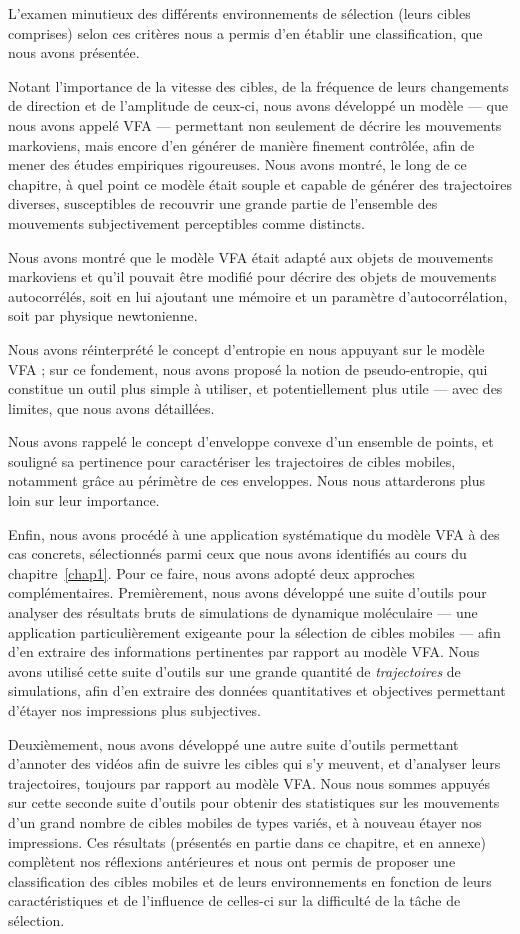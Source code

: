	L'examen minutieux des différents environnements de sélection (leurs cibles comprises) selon ces critères nous a permis d'en établir une classification, que nous avons présentée.
	
	Notant l'importance de la vitesse des cibles, de la fréquence de leurs changements de direction et de l'amplitude de ceux-ci, nous avons développé un modèle --- que nous avons appelé VFA --- permettant non seulement de décrire les mouvements markoviens, mais encore d'en générer de manière finement contrôlée, afin de mener des études empiriques rigoureuses. Nous avons montré, le long de ce chapitre, à quel point ce modèle était souple et capable de générer des trajectoires diverses, susceptibles de recouvrir une grande partie de l'ensemble des mouvements subjectivement perceptibles comme distincts.
	
	Nous avons montré que le modèle VFA était adapté aux objets de mouvements markoviens et qu'il pouvait être modifié pour décrire des objets de mouvements autocorrélés, soit en lui ajoutant une mémoire et un paramètre d'autocorrélation, soit par physique newtonienne.
	
	Nous avons réinterprété le concept d'entropie en nous appuyant sur le modèle VFA ; sur ce fondement, nous avons proposé la notion de pseudo-entropie, qui constitue un outil plus simple à utiliser, et potentiellement plus utile --- avec des limites, que nous avons détaillées.	
	
	Nous avons rappelé le concept d'enveloppe convexe d'un ensemble de points, et souligné sa pertinence pour caractériser les trajectoires de cibles mobiles, notamment grâce au périmètre de ces enveloppes. Nous nous attarderons plus loin sur leur importance.
	
	Enfin, nous avons procédé à une application systématique du modèle VFA à des cas concrets, sélectionnés parmi ceux que nous avons identifiés au cours du chapitre~\ref{chap1}. Pour ce faire, nous avons adopté deux approches complémentaires. Premièrement, nous avons développé une suite d'outils pour analyser des résultats bruts de simulations de dynamique moléculaire --- une application particulièrement exigeante pour la sélection de cibles mobiles --- afin d'en extraire des informations pertinentes par rapport au modèle VFA. Nous avons utilisé cette suite d'outils sur une grande quantité de \emph{trajectoires} de simulations, afin d'en extraire des données quantitatives et objectives permettant d'étayer nos impressions plus subjectives.
	
	Deuxièmement, nous avons développé une autre suite d'outils permettant d'annoter des vidéos afin de suivre les cibles qui s'y meuvent, et d'analyser leurs trajectoires, toujours par rapport au modèle VFA. Nous nous sommes appuyés sur cette seconde suite d'outils pour obtenir des statistiques sur les mouvements d'un grand nombre de cibles mobiles de types variés, et à nouveau étayer nos impressions. Ces résultats (présentés en partie dans ce chapitre, et en annexe) complètent nos réflexions antérieures et nous ont permis de proposer une classification des cibles mobiles et de leurs environnements en fonction de leurs caractéristiques et de l'influence de celles-ci sur la difficulté de la tâche de sélection.
	
